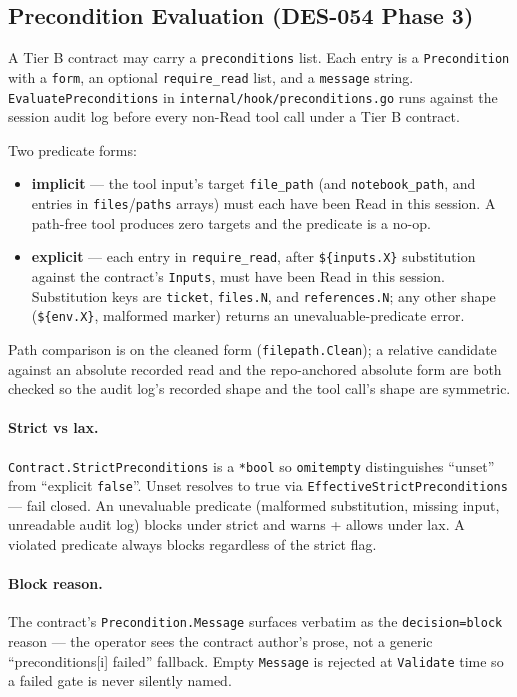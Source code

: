 \documentclass[a4paper,10pt]{article}
\newcommand{\field}[1]{\texttt{#1}}
\newcommand{\fpath}[1]{\texttt{#1}}
\begin{document}
\subsection{Precondition Evaluation (DES-054 Phase 3)}

A Tier B contract may carry a \field{preconditions} list.  Each
entry is a \texttt{Precondition} with a \field{form}, an optional
\field{require\_read} list, and a \field{message} string.
\texttt{EvaluatePreconditions} in
\fpath{internal/hook/preconditions.go} runs against the session
audit log before every non-Read tool call under a Tier B
contract.

Two predicate forms:

\begin{itemize}
  \item \textbf{implicit} --- the tool input's target
    \field{file\_path} (and \field{notebook\_path}, and entries
    in \field{files}/\field{paths} arrays) must each have been
    Read in this session.  A path-free tool produces zero
    targets and the predicate is a no-op.
  \item \textbf{explicit} --- each entry in \field{require\_read},
    after \texttt{\$\{inputs.X\}} substitution against the
    contract's \field{Inputs}, must have been Read in this
    session.  Substitution keys are \texttt{ticket},
    \texttt{files.N}, and \texttt{references.N}; any other shape
    (\texttt{\$\{env.X\}}, malformed marker) returns an
    unevaluable-predicate error.
\end{itemize}

Path comparison is on the cleaned form
(\texttt{filepath.Clean}); a relative candidate against an
absolute recorded read and the repo-anchored absolute form are
both checked so the audit log's recorded shape and the tool
call's shape are symmetric.

\paragraph{Strict vs lax.}  \field{Contract.StrictPreconditions}
is a \texttt{*bool} so \texttt{omitempty} distinguishes ``unset''
from ``explicit \texttt{false}''.  Unset resolves to true via
\texttt{EffectiveStrictPreconditions} --- fail closed.  An
unevaluable predicate (malformed substitution, missing input,
unreadable audit log) blocks under strict and warns + allows
under lax.  A violated predicate always blocks regardless of
the strict flag.

\paragraph{Block reason.}  The contract's
\field{Precondition.Message} surfaces verbatim as the
\texttt{decision=block} reason --- the operator sees the contract
author's prose, not a generic ``preconditions[i] failed''
fallback.  Empty \field{Message} is rejected at
\texttt{Validate} time so a failed gate is never silently named.
\end{document}
